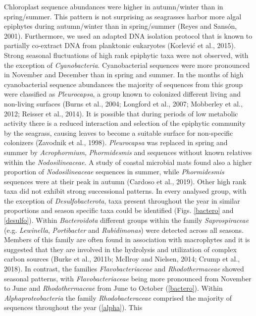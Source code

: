 \documentclass[12pt,]{article}
\begin{document}
Chloroplast sequence abundances were higher in autumn/winter than in
spring/summer. This pattern is not surprising as seagrasses harbor more
algal epiphytes during autumn/winter than in spring/summer (Reyes and
Sansón, 2001). Furthermore, we used an adapted DNA isolation protocol
that is known to partially co-extract DNA from planktonic eukaryotes
(Korlević et al., 2015). Strong seasonal fluctuations of high rank
epiphytic taxa were not observed, with the exception of
\emph{Cyanobacteria}. Cyanobacterial sequences were more pronounced in
November and December than in spring and summer. In the months of high
cyanobacterial sequence abundances the majority of sequences from this
group were classified as \emph{Pleurocapsa}, a group known to colonized
different living and non-living surfaces (Burns et al., 2004; Longford
et al., 2007; Mobberley et al., 2012; Reisser et al., 2014). It is
possible that during periods of low metabolic activity there is a
reduced interaction and selection of the epiphytic community by the
seagrass, causing leaves to become a suitable surface for non-specific
colonizers (Zavodnik et al., 1998). \emph{Pleurocapsa} was replaced in
spring and summer by \emph{Acrophormium}, \emph{Phormidesmis} and
sequences without known relatives within the \emph{Nodosilineaceae}. A
study of coastal microbial mats found also a higher proportion of
\emph{Nodosilineaceae} sequences in summer, while \emph{Phormidesmis}
sequences were at their peak in autumn (Cardoso et al., 2019). Other
high rank taxa did not exhibit strong successional patterns. In every
analysed group, with the exception of \emph{Desulfobacterota}, taxa
present throughout the year in similar proportions and season specific
taxa could be identified (Figs. \ref{bactero} and \ref{desulfo}). Within
\emph{Bacteroidota} different groups within the family
\emph{Saprospiraceae} (e.g. \emph{Lewinella}, \emph{Portibacter} and
\emph{Rubidimonas}) were detected across all seasons. Members of this
family are often found in association with macrophytes and it is
suggested that they are involved in the hydrolysis and utilization of
complex carbon sources (Burke et al., 2011b; McIlroy and Nielsen, 2014;
Crump et al., 2018). In contrast, the families \emph{Flavobacteriaceae}
and \emph{Rhodothermaceae} showed seasonal patterns, with
\emph{Flavobacteriaceae} being more pronounced from November to June and
\emph{Rhodothermaceae} from June to October (\autoref{bactero}). Within
\emph{Alphaproteobacteria} the family \emph{Rhodobacteraceae} comprised
the majority of sequences throughout the year (\autoref{alpha}). This
\end{document}

